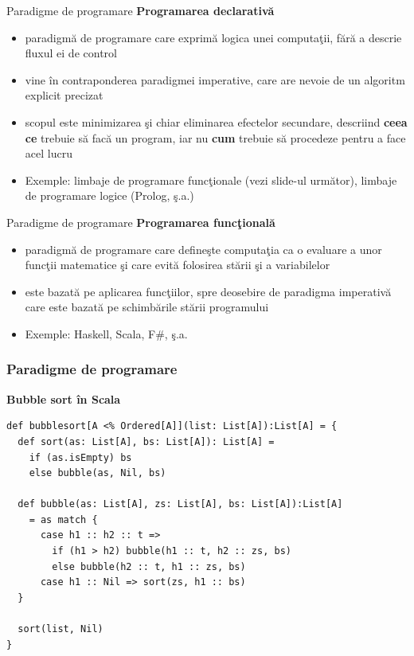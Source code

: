 \documentclass[pdf]{beamer}
\begin{document}
\begin{frame}{Paradigme de programare}
\textbf{Programarea declarativă}
\begin{itemize}
\item
paradigmă de programare care exprimă logica unei computaţii, fără a descrie fluxul ei de control
\item
vine în contraponderea paradigmei imperative, care are nevoie de un algoritm explicit precizat
\item
scopul este minimizarea şi chiar eliminarea efectelor secundare, descriind \textbf{ceea ce} trebuie să facă un program, iar nu \textbf{cum} trebuie să procedeze pentru a face acel lucru
\item
Exemple: limbaje de programare funcţionale (vezi slide-ul următor), limbaje de programare logice (Prolog, ş.a.)
\end{itemize}
\end{frame}



\begin{frame}{Paradigme de programare}
\textbf{Programarea funcţională}
\begin{itemize}
\item
paradigmă de programare care defineşte computaţia ca o evaluare a unor funcţii matematice şi care evită folosirea stării şi a variabilelor
\item
este bazată pe aplicarea funcţiilor, spre deosebire de paradigma imperativă care este bazată pe schimbările stării programului
\item
Exemple: Haskell, Scala, F\#, ş.a.
\end{itemize}
\end{frame}



\begin{frame}[fragile]
\frametitle{Paradigme de programare}
\textbf{Bubble sort în Scala}
\begin{verbatim}
def bubblesort[A <% Ordered[A]](list: List[A]):List[A] = {
  def sort(as: List[A], bs: List[A]): List[A] =
    if (as.isEmpty) bs
    else bubble(as, Nil, bs)

  def bubble(as: List[A], zs: List[A], bs: List[A]):List[A] 
    = as match {
      case h1 :: h2 :: t =>
        if (h1 > h2) bubble(h1 :: t, h2 :: zs, bs)
        else bubble(h2 :: t, h1 :: zs, bs)
      case h1 :: Nil => sort(zs, h1 :: bs)
  }
  
  sort(list, Nil)
}
\end{verbatim}
\end{frame}
\end{document}
